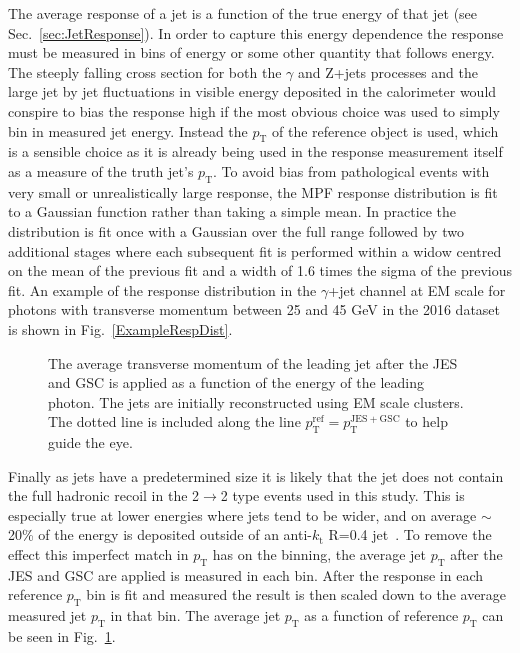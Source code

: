 The average response of a jet is a function of the true energy of that jet (see Sec.~\ref{sec:JetResponse}).  
In order to capture this energy dependence the response must be measured in bins of energy or some other quantity that follows energy.  
The steeply falling cross section for both the $\gamma$ and Z+jets processes and the large jet by jet fluctuations in visible energy deposited in the calorimeter would conspire to bias the response high if the most obvious choice was used to simply bin in measured jet energy.  
Instead the $p_{\mathrm T}$ of the reference object is used, which is a sensible choice as it is already being used in the response measurement itself as a measure of the truth jet's $p_{\mathrm T}$.  
To avoid bias from pathological events with very small or unrealistically large response, the MPF response distribution is fit to a Gaussian function rather than taking a simple mean.  
In practice the distribution is fit once with a Gaussian over the full range followed by two additional stages where each subsequent fit is performed within a widow centred on the mean of the previous fit and a width of 1.6 times the sigma of the previous fit.  
An example of the response distribution in the $\gamma$+jet channel at EM scale for photons with transverse momentum between 25 and 45 GeV in the 2016 dataset is shown in Fig.~\ref{ExampleRespDist}.  

\begin{figure}[!ht]
  \begin{center}
  \end{center}
  \caption[Average measured jet momentum Vs. refence $p_{\mathrm T}$]
  {\small The average transverse momentum of the leading jet after the JES and GSC is applied as a function of the energy of the leading photon.  The jets are initially reconstructed using EM scale clusters.  The dotted line is included along the line $p_{\mathrm T}^{\mathrm {ref}}=p_{\mathrm T}^{\mathrm{JES+GSC}}$ to help guide the eye.}
  \label{plot:MappingExample}
\end{figure}


Finally as jets have a predetermined size it is likely that the jet does not contain the full hadronic recoil in the 2$\rightarrow$2 type events used in this study.  
This is especially true at lower energies where jets tend to be wider, and on average $\sim$20\% of the energy is deposited outside of an anti-$k_{\mathrm t}$ R=0.4 jet~\cite{ATLAS-CONF-2015-057}.  
To remove the effect this imperfect match in $p_{\mathrm T}$ has on the binning, the average jet $p_{\mathrm T}$ after the JES and GSC are applied is measured in each bin.  
After the response in each reference $p_{\mathrm T}$ bin is fit and measured the result is then scaled down to the average measured jet $p_{\mathrm T}$ in that bin.  
The average jet $p_{\mathrm T}$ as a function of reference $p_{\mathrm T}$ can be seen in Fig.~\ref{plot:MappingExample}.  

